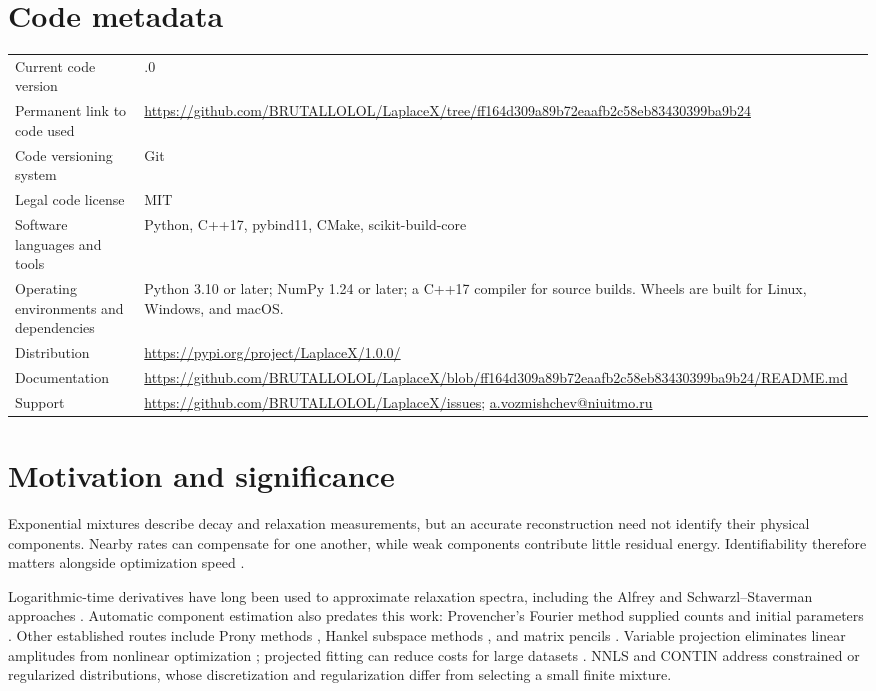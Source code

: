 \documentclass[preprint,11pt]{elsarticle}
\begin{document}
\section*{Code metadata}
\begingroup\small
\noindent\begin{tabularx}{\textwidth}{@{}>{\raggedright\arraybackslash}p{}>{\raggedright\arraybackslash}X@{}}
\toprule
Current code version & 1.0.0\\
Permanent link to code used & \url{https://github.com/BRUTALLOLOL/LaplaceX/tree/ff164d309a89b72eaafb2c58eb83430399ba9b24}\\
Code versioning system & Git\\
Legal code license & MIT\\
Software languages and tools & Python, C++17, pybind11, CMake, scikit-build-core\\
Operating environments and dependencies & Python 3.10 or later; NumPy 1.24 or later; a C++17 compiler for source builds. Wheels are built for Linux, Windows, and macOS.\\
Distribution & \url{https://pypi.org/project/LaplaceX/1.0.0/}\\
Documentation & \url{https://github.com/BRUTALLOLOL/LaplaceX/blob/ff164d309a89b72eaafb2c58eb83430399ba9b24/README.md}\\
Support & \url{https://github.com/BRUTALLOLOL/LaplaceX/issues}; \href{mailto:a.vozmishchev@niuitmo.ru}{a.vozmishchev@niuitmo.ru}\\
\bottomrule
\end{tabularx}
\endgroup

\section{Motivation and significance}
Exponential mixtures describe decay and relaxation measurements, but an accurate
reconstruction need not identify their physical components. Nearby rates can
compensate for one another, while weak components contribute little residual
energy. Identifiability therefore matters alongside optimization speed
\cite{istratov}.

Logarithmic-time derivatives have long been used to approximate relaxation
spectra, including the Alfrey and Schwarzl--Staverman approaches
\cite{alfrey,schwarzl}. Automatic component estimation also predates this work:
Provencher's Fourier method supplied counts and initial parameters
\cite{provencher}. Other established routes include Prony methods
\cite{prony}, Hankel subspace methods \cite{hsvd}, and matrix pencils
\cite{pencil}. Variable projection eliminates linear amplitudes from nonlinear
optimization \cite{golub}; projected fitting can reduce costs for large datasets
\cite{hokanson}. NNLS \cite{nnls} and CONTIN \cite{contin,continprogram}
address constrained or regularized distributions, whose discretization and
regularization differ from selecting a small finite mixture.
\end{document}

